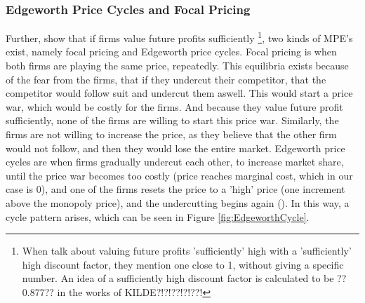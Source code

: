 \documentclass{article}
\begin{document}
\subsubsection{Edgeworth Price Cycles and Focal Pricing} \label{EdgeworthFocalpricingSec}
Further, \cite{MaskinTirole} show that if firms value future profits sufficiently \footnote{When \cite{MaskinTirole} talk about valuing future profits 'sufficiently' high with a 'sufficiently' high discount factor, they mention one close to 1, without giving a specific number. An idea of a sufficiently high discount factor is calculated to be ??0.877?? in the works of KILDE?!?!??!?!??!}, two kinds of MPE's exist, 
namely focal pricing and Edgeworth price cycles.
Focal pricing is when both firms are playing the same price, repeatedly. This equilibria exists because of the fear from the firms, that if they undercut their competitor, that the competitor would follow suit and undercut them aswell. This would start a price war, which would be costly for the firms. And because they value future profit sufficiently, none of the firms are willing to start this price war. Similarly, the firms are not willing to increase the price, as they believe that the other firm would not follow, and then they would lose the entire market.
\newline
Edgeworth price cycles are when firms gradually undercut each other, to increase market share, until the price war becomes too costly (price reaches marginal cost, which in our case is 0), and one of the firms resets the price to a 'high' price (one increment above the monopoly price), and the undercutting begins again (\cite{MaskinTirole}). In this way, a cycle pattern arises, which can be seen in Figure \ref{fig:EdgeworthCycle}.
\end{document}
